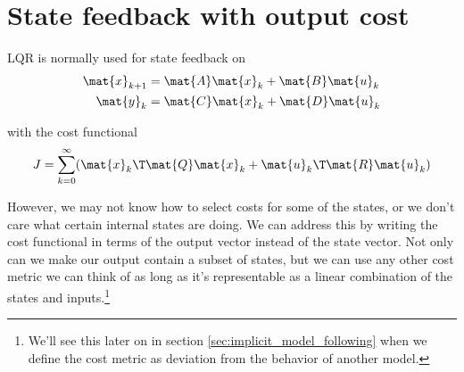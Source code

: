 \section{State feedback with output cost}

LQR is normally used for state feedback on
\begin{align*}
  \mat{x}_{k+1} &= \mat{A}\mat{x}_k + \mat{B}\mat{u}_k \\
  \mat{y}_k &= \mat{C}\mat{x}_k + \mat{D}\mat{u}_k
\end{align*}

with the cost functional
\begin{equation*}
  J = \sum_{k=0}^\infty (\mat{x}_k\T\mat{Q}\mat{x}_k +
    \mat{u}_k\T\mat{R}\mat{u}_k)
\end{equation*}

However, we may not know how to select costs for some of the states, or we don't
care what certain internal states are doing. We can address this by writing the
cost functional in terms of the output vector instead of the state vector. Not
only can we make our output contain a subset of states, but we can use any other
cost metric we can think of as long as it's representable as a linear
combination of the states and inputs.\footnote{We'll see this later on in
section \ref{sec:implicit_model_following} when we define the cost metric as
deviation from the behavior of another model.}

